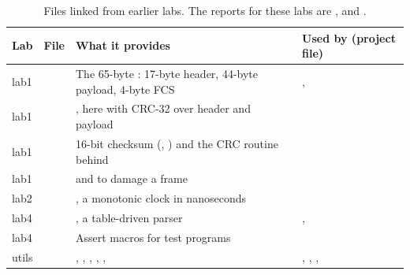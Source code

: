 \begin{table}[htbp]
\centering
\footnotesize
\caption{Files linked from earlier labs. The reports for these labs are \cite{lab1}, \cite{lab2} and \cite{lab4}.}
\label{tab:d-reuse}
\begin{tabularx}{\linewidth}{@{}l l Y l@{}}
\toprule
Lab & File & What it provides & Used by (project file) \\
\midrule
lab1 &  & The 65-byte : 17-byte header, 44-byte payload, 4-byte FCS & ,  \\
lab1 &  & , here with CRC-32 over header and payload &  \\
lab1 &  & 16-bit checksum (, ) and the CRC routine behind  &  \\
lab1 &  &  and  to damage a frame &  \\
lab2 &  & , a monotonic clock in nanoseconds &  \\
lab4 &  & , a table-driven  parser & ,  \\
lab4 &  & Assert macros for test programs &  \\
utils &  & , , , , ,  & , , ,  \\
\bottomrule
\end{tabularx}
\end{table}
